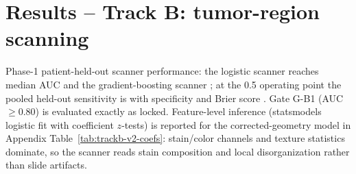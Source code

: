 \documentclass[11pt]{article}
\begin{document}
\section{Results -- Track B: tumor-region scanning}
Phase-1 patient-held-out scanner performance: the logistic
scanner reaches median AUC \numAucLr{} and the gradient-boosting scanner \numAucGb{};
at the 0.5 operating point the pooled held-out sensitivity is \numSens{} with
specificity \numSpec{} and Brier score \numBrier{}. Gate G-B1 (AUC $\ge 0.80$) is
evaluated exactly as locked. Feature-level inference (statsmodels logistic fit with
coefficient $z$-tests) is reported for the corrected-geometry model in Appendix
Table~\ref{tab:trackb-v2-coefs}: stain/color channels and texture statistics
dominate, so the scanner reads stain composition and local disorganization rather
than slide artifacts.
\end{document}
